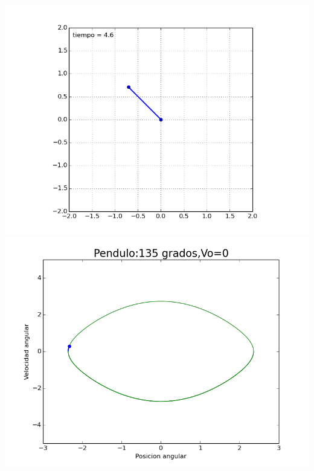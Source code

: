 \documentclass[12pt]{article}
\begin{document}
\begin{center}
\includegraphics[scale=0.5]{135.png}\\
\includegraphics[scale=0.5]{figure_135.png}
\end{center}
\end{document}
